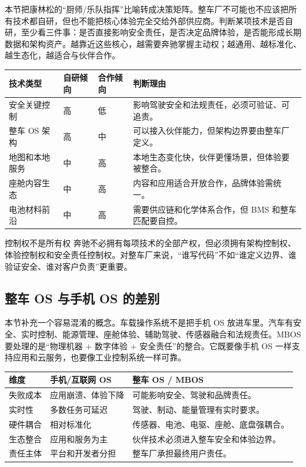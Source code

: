 \documentclass[a4paper]{article}
\begin{document}
本节把康林松的“厨师/乐队指挥”比喻转成决策矩阵。整车厂不可能也不应该把所有技术都自研，但也不能把核心体验完全交给外部供应商。判断某项技术是否自研，至少看三件事：是否直接影响安全责任，是否决定品牌体验，是否能形成长期数据和架构资产。越靠近这些核心，越需要奔驰掌握主动权；越通用、越标准化、越生态化，越适合与伙伴合作。

\noindent\begin{tabularx}{\textwidth}{p{}p{}p{}X}
\toprule
技术类型 & 自研倾向 & 合作倾向 & 判断理由 \\
\midrule
安全关键控制 & 高 & 低 & 影响驾驶安全和法规责任，必须可验证、可追责。 \\
整车 OS 架构 & 高 & 中 & 可以接入伙伴能力，但架构边界要由整车厂定义。 \\
地图和本地服务 & 中 & 高 & 本地生态变化快，伙伴更懂场景，但体验要被整合。 \\
座舱内容生态 & 中 & 高 & 内容和应用适合开放合作，品牌体验需统一。 \\
电池材料前沿 & 中 & 高 & 需要供应链和化学体系合作，但 BMS 和整车匹配要自控。 \\
\bottomrule
\end{tabularx}

\begin{importantbox}{控制权不是所有权}
奔驰不必拥有每项技术的全部产权，但必须拥有架构控制权、体验控制权和安全责任控制权。对整车厂来说，“谁写代码”不如“谁定义边界、谁验证安全、谁对客户负责”更重要。
\end{importantbox}

\subsection{整车 OS 与手机 OS 的差别}

本节补充一个容易混淆的概念。车载操作系统不是把手机 OS 放进车里。汽车有安全、实时控制、能源管理、座舱体验、辅助驾驶、传感器融合和法规责任。MBOS 要处理的是“物理机器 + 数字体验 + 安全责任”的整合。它既要像手机 OS 一样支持应用和云服务，也要像工业控制系统一样可靠。

\noindent\begin{tabularx}{\textwidth}{p{}p{}X}
\toprule
维度 & 手机/互联网 OS & 整车 OS / MBOS \\
\midrule
失败成本 & 应用崩溃、体验下降 & 可能影响安全、驾驶和品牌责任。 \\
实时性 & 多数任务可延迟 & 驾驶、制动、能量管理有实时要求。 \\
硬件耦合 & 相对标准化 & 传感器、电池、电驱、座舱、底盘强耦合。 \\
生态整合 & 应用和服务为主 & 伙伴技术必须进入整车安全和体验边界。 \\
责任主体 & 平台和开发者分担 & 整车厂承担最终用户责任。 \\
\bottomrule
\end{tabularx}
\end{document}
